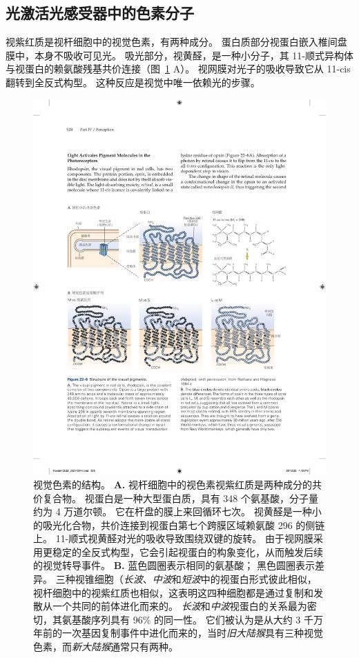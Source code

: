\subsection{光激活光感受器中的色素分子}

视紫红质是视杆细胞中的视觉色素，有两种成分。
蛋白质部分视蛋白嵌入椎间盘膜中，本身不吸收可见光。 
吸光部分，视黄醛，是一种小分子，其 11-顺式异构体与视蛋白的赖氨酸残基共价连接（图~\ref{fig:22_8} A）。
视网膜对光子的吸收导致它从 11-cis 翻转到全反式构型。
这种反应是视觉中唯一依赖光的步骤。


\begin{figure}[htbp]
	\centering
	\includegraphics[width=1.0\linewidth]{chap22/fig_22_8}
	\caption{视觉色素的结构。
		\textbf{A.} 视杆细胞中的视色素视紫红质是两种成分的共价复合物。
		视蛋白是一种大型蛋白质，具有 348 个氨基酸，分子量约为 4 万道尔顿。
		它在杆盘的膜上来回循环七次。
		视黄醛是一种小的吸光化合物，共价连接到视蛋白第七个跨膜区域赖氨酸 296 的侧链上。 
		11-顺式视黄醛对光的吸收导致围绕双键的旋转。
		由于视网膜采用更稳定的全反式构型，它会引起视蛋白的构象变化，从而触发后续的视觉转导事件\cite{nathans1984isolation}。
		\textbf{B.} 蓝色圆圈表示相同的氨基酸；
		黑色圆圈表示差异。
		三种视锥细胞（\textit{长波}、\textit{中波}和\textit{短波}中的视蛋白形式彼此相似，视杆细胞中的视紫红质也相似，这表明这四种细胞都是通过复制和发散从一个共同的前体进化而来的。
		\textit{长波}和\textit{中波}视蛋白的关系最为密切，其氨基酸序列具有 96\% 的同一性。
		它们被认为是从大约 3 千万年前的一次基因复制事件中进化而来的，当时\textit{旧大陆猴}具有三种视觉色素，而\textit{新大陆猴}通常只有两种。}
	\label{fig:22_8}
\end{figure}


